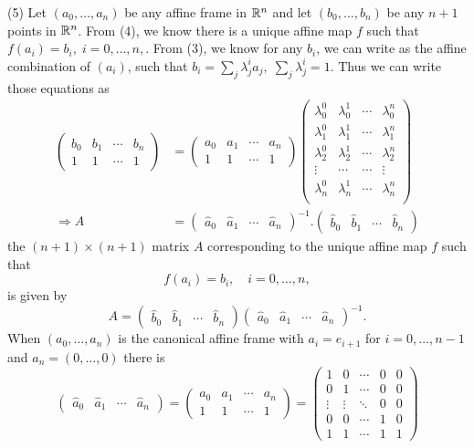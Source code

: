 \documentclass[12pt]{article}
\begin{document}
\medskip
(5)
Let $(a_0, \ldots, a_n)$ be any affine frame in $\mathbb{R}^n$ and
let $(b_0, \ldots, b_n)$ be any $n + 1$ points in $\mathbb{R}^n$. 
From (4), we know there is a unique affine map $f$ such that $
f(a_i) = b_i, \; i = 0, \ldots, n, 
$. From (3), we know for any $b_i$, we can write as the affine combination of $(a_i)$, such that $b_i = \sum_j \lambda_j^i a_j, \; \sum_j \lambda_j^i = 1$. Thus we can write those equations as
\begin{align*}
\begin{pmatrix}
b_0 & b_1& \cdots& b_n \\
1 & 1 & \cdots & 1 
\end{pmatrix} &=
\begin{pmatrix}
a_0 & a_1& \cdots& a_n \\
1 & 1 & \cdots & 1 
\end{pmatrix} 
\begin{pmatrix}
\lambda_0^0 & \lambda_0^1 & \cdots& \lambda_0^n \\
\lambda_1^0 & \lambda_1^1 & \cdots& \lambda_1^n \\
\lambda_2^0 & \lambda_2^1 & \cdots& \lambda_2^n \\
\vdots & \cdots & \cdots & \vdots \\
\lambda_n^0 & \lambda_n^1 & \cdots& \lambda_n^n \\
\end{pmatrix} \\
\Rightarrow 
A &= 
\begin{pmatrix}
\widehat{a}_0 & \widehat{a}_1 & \cdots & \widehat{a}_n   
\end{pmatrix}^{-1}.
\begin{pmatrix}
\widehat{b}_0 & \widehat{b}_1 & \cdots & \widehat{b}_n   
\end{pmatrix}
\end{align*}
the $(n + 1)\times (n + 1)$ matrix $A$ corresponding to
the unique affine map $f$
such that 
\[
f(a_i) = b_i, \quad i = 0, \ldots, n, 
\]
is given by
\[
A = 
\begin{pmatrix}
\widehat{b}_0 & \widehat{b}_1 & \cdots & \widehat{b}_n   
\end{pmatrix}
\begin{pmatrix}
\widehat{a}_0 & \widehat{a}_1 & \cdots & \widehat{a}_n   
\end{pmatrix}^{-1}.
\]
When $(a_0, \ldots, a_n)$ is the canonical  affine frame with 
$a_i = e_{i+1}$ for $i = 0, \ldots, n - 1$ and
$a_n = (0, \ldots, 0)$ there is 
\[
\begin{pmatrix}
\widehat{a}_0 & \widehat{a}_1 & \cdots & \widehat{a}_n   
\end{pmatrix}
=
\begin{pmatrix}
a_0 & a_1 & \cdots & a_n   \\
1 & 1 & \cdots & 1 
\end{pmatrix}
=
\begin{pmatrix}
1  & 0 & \cdots & 0 & 0 \\
0  & 1 & \cdots & 0 & 0\\
\vdots & \vdots & \ddots & 0 & 0 \\
0  &  0  & \cdots & 1 & 0 \\
1  &  1  & \cdots & 1 & 1
\end{pmatrix}
\] 
\end{document}
